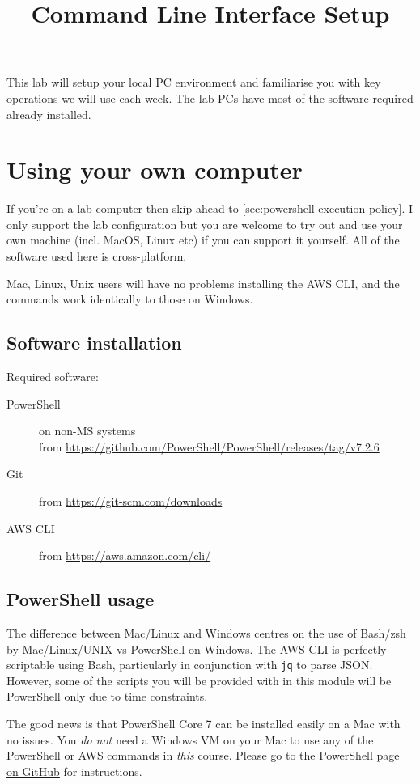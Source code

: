 \documentclass{pgnotes}
\title{Command Line Interface Setup}
\begin{document}
\maketitle

This lab will setup your local PC environment and familiarise you with key operations we will use each week.
The lab PCs have most of the software required already installed.

\section{Using your own computer}

If you're on a lab computer then skip ahead to \autoref{sec:powershell-execution-policy}.
I only support the lab configuration but you are welcome to try out and use your own machine (incl. MacOS, Linux etc) if you can support it yourself.
All of the software used here is cross-platform.

Mac, Linux, Unix users will have no problems installing the AWS CLI, and
the commands work identically to those on Windows.


\subsection{Software installation}

Required software:
\begin{description}
\item[PowerShell] on non-MS systems\\from \url{https://github.com/PowerShell/PowerShell/releases/tag/v7.2.6}
\item[Git] from \url{https://git-scm.com/downloads}
\item[AWS CLI] from \url{https://aws.amazon.com/cli/}
\end{description}

\subsection{PowerShell usage}

The difference between Mac/Linux and Windows centres on the use of
Bash/zsh by Mac/Linux/UNIX vs PowerShell on Windows. The AWS CLI is
perfectly scriptable using Bash, particularly in conjunction with
\texttt{jq} to parse JSON. However, some of the scripts you will be
provided with in this module will be PowerShell only due to time
constraints.

The good news is that PowerShell Core 7 can be installed easily on a Mac
with no issues. You \emph{do not} need a Windows VM on your Mac to use
any of the PowerShell or AWS commands in \emph{this} course. Please go
to the \href{https://github.com/PowerShell/PowerShell}{PowerShell page
on GitHub} for instructions.
\end{document}
